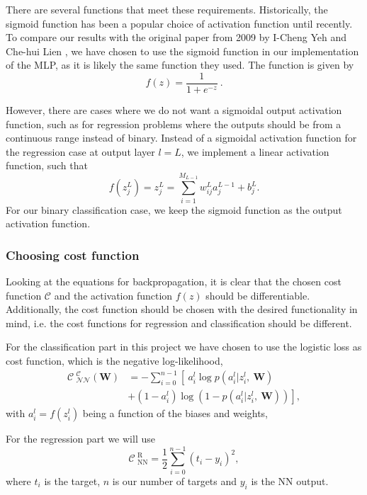 \documentclass[a4paper, 11pt, twocolumn]{article}
\begin{document}
There are several functions that meet these requirements. Historically, the 
sigmoid function has been a popular choice of activation function until recently. 
To compare our results with the original paper from 2009 by I-Cheng Yeh and 
Che-hui Lien \cite{origarticle}, we have chosen to use the sigmoid function in 
our implementation of the MLP, as it is likely the same function they used. The 
function is given by 
\begin{equation}
f(z) = \frac{1}{1+e^{-z}}\ .
\end{equation}


However, there are cases where we do not want a sigmoidal output activation 
function, such as for regression problems where the outputs should be from a 
continuous range instead of binary. Instead of a sigmoidal activation function 
for the regression case at output layer $l=L$, we implement a linear activation 
function, such that 
\begin{equation}
f(z_j^L)=z_j^L= \sum_{i=1}^{M_{L-1}} w_{ij}^L a_j^{L-1} + b_j^L.
\end{equation}
For our binary classification case, we keep the sigmoid function as the output 
activation function.
\subsubsection{Choosing cost function}
Looking at the equations for backpropagation, it is clear that the chosen cost 
function $\mathcal{C}$ and the activation function $f(z)$ should be differentiable. 
Additionally, the cost function should be chosen with the desired functionality 
in mind, i.e. the cost functions for regression and classification should be different.

For the classification part in this project we have chosen to use the logistic 
loss as cost function, which is the negative log-likelihood,
\begin{align}
\mathcal{C_\text{ NN}^\text{ C}}(\bm{W}) &= -\sum_{i=0}^{n-1} \left[\  a_i^l\log p\left(a_i^l|z_i^l,\ \bm{ W} \right) \right.  \\
 																					&      \left. + (1-a_i^l)\log \left(1-p(a_i^l|z_i^l,\ \bm{ W})\right)    \right],  \nonumber
\end{align}
with $a_i^l=f(z_i^l)$ being a function of the biases and weights, 

For the regression part we will use
\begin{equation}
\mathcal{C}_\text{ NN}^\text{ R} = \frac{1}{2}\sum_{i=0}^{n-1}(t_i-y_i)^2,
\end{equation}
where $t_i$ is the target, $n$ is our number of targets and $y_i$ is the NN output. 
\end{document}
